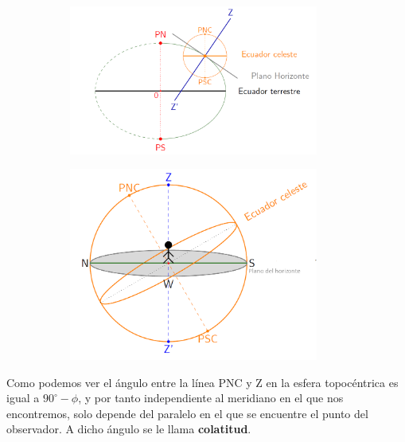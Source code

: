 \begin{figure}[h]
	\centering
	\begin{subfigure}{0.55\textwidth}
		\centering
		\includegraphics[width=0.9\textwidth]{Cuerpo/Imagenes/01_Plano.png}
	\end{subfigure}
	\hfill
	\begin{subfigure}{0.4\textwidth}
		\centering
		\includegraphics[width=0.9\textwidth]{Cuerpo/Imagenes/01_Esfera.png}
	\end{subfigure}
\end{figure}
Como podemos ver el ángulo entre la línea PNC y Z en la esfera topocéntrica es igual a $90^\circ - \phi$, y por tanto independiente al meridiano en el que nos encontremos, solo depende del paralelo en el que se encuentre el punto del observador. A dicho ángulo se le llama \textbf{colatitud}.

